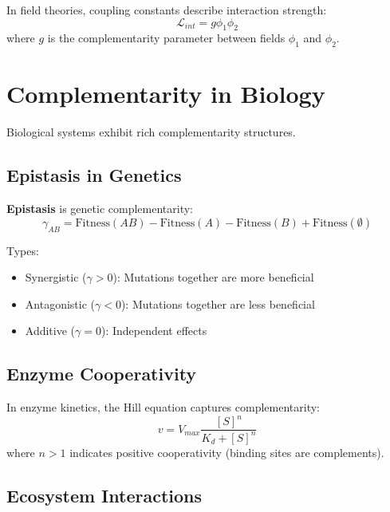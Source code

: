 In field theories, coupling constants describe interaction strength:
\begin{equation}
\mathcal{L}_{int} = g \phi_1 \phi_2
\end{equation}
where $g$ is the complementarity parameter between fields $\phi_1$ and $\phi_2$.

\section{Complementarity in Biology}
\label{sec:biology}

Biological systems exhibit rich complementarity structures.

\subsection{Epistasis in Genetics}

\textbf{Epistasis} is genetic complementarity:
\begin{equation}
\gamma_{AB} = \text{Fitness}(AB) - \text{Fitness}(A) - \text{Fitness}(B) + \text{Fitness}(\emptyset)
\end{equation}

Types:
\begin{itemize}
    \item Synergistic ($\gamma > 0$): Mutations together are more beneficial
    \item Antagonistic ($\gamma < 0$): Mutations together are less beneficial
    \item Additive ($\gamma = 0$): Independent effects
\end{itemize}

\subsection{Enzyme Cooperativity}

In enzyme kinetics, the Hill equation captures complementarity:
\begin{equation}
v = V_{max} \frac{[S]^n}{K_d + [S]^n}
\end{equation}
where $n > 1$ indicates positive cooperativity (binding sites are complements).

\subsection{Ecosystem Interactions}


